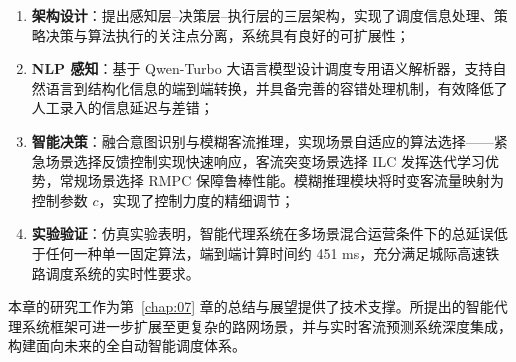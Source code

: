 \begin{enumerate}
    \item \textbf{架构设计}：提出感知层–决策层–执行层的三层架构，实现了调度信息处理、策略决策与算法执行的关注点分离，系统具有良好的可扩展性；
    \item \textbf{NLP 感知}：基于 Qwen-Turbo 大语言模型设计调度专用语义解析器，支持自然语言到结构化信息的端到端转换，并具备完善的容错处理机制，有效降低了人工录入的信息延迟与差错；
    \item \textbf{智能决策}：融合意图识别与模糊客流推理，实现场景自适应的算法选择——紧急场景选择反馈控制实现快速响应，客流突变场景选择 ILC 发挥迭代学习优势，常规场景选择 RMPC 保障鲁棒性能。模糊推理模块将时变客流量映射为控制参数 $c$，实现了控制力度的精细调节；
    \item \textbf{实验验证}：仿真实验表明，智能代理系统在多场景混合运营条件下的总延误低于任何一种单一固定算法，端到端计算时间约 451 ms，充分满足城际高速铁路调度系统的实时性要求。
\end{enumerate}

本章的研究工作为第~\ref{chap:07} 章的总结与展望提供了技术支撑。所提出的智能代理系统框架可进一步扩展至更复杂的路网场景，并与实时客流预测系统深度集成，构建面向未来的全自动智能调度体系。
